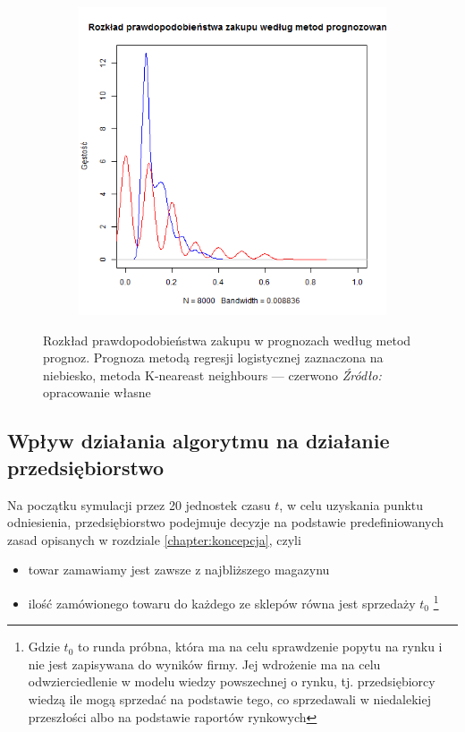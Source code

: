 \documentclass[polish, twoside, 12pt, a4paper]{article}
\theoremstyle{definition}
\theoremstyle{plain}
\theoremstyle{remark}
\begin{document}
\begin{figure}[hbt]
  \centering

  \begin{subfigure}[t]{0.45\textwidth}
    \includegraphics[width=\textwidth]{pictures/rozklad_prognoz}
  \end{subfigure}
  \captionsetup{margin=10pt,font=small,labelfont=bf,width=.8\textwidth}

  \caption[Rozkład prawdopodobieństwa zakupu w prognozach]{Rozkład prawdopodobieństwa zakupu w prognozach według metod prognoz. Prognoza metodą regresji logistycznej zaznaczona na niebiesko, metoda K-neareast neighbours --- czerwono \textit{Źródło:} opracowanie własne}\label{fig:rozklad_lg_kn}
\end{figure}

\subsection{Wpływ działania algorytmu na działanie przedsiębiorstwo} \label{chapter:wyniki}

Na początku symulacji przez 20 jednostek czasu $t$, w celu uzyskania punktu odniesienia, przedsiębiorstwo podejmuje decyzje na podstawie predefiniowanych zasad opisanych w rozdziale \ref{chapter:koncepcja}, czyli 

	\begin{itemize}
		\item towar zamawiamy jest zawsze z najbliższego magazynu
		\item ilość zamówionego towaru do każdego ze sklepów równa jest sprzedaży $t_0$ \footnote{Gdzie $t_0$ to runda próbna, która ma na celu sprawdzenie popytu na rynku i nie jest zapisywana do wyników firmy. Jej wdrożenie ma na celu odwzierciedlenie w modelu wiedzy powszechnej o rynku, tj. przedsiębiorcy wiedzą ile mogą sprzedać na podstawie tego, co sprzedawali w niedalekiej przeszłości albo na podstawie raportów rynkowych}
	\end{itemize}
\end{document}
